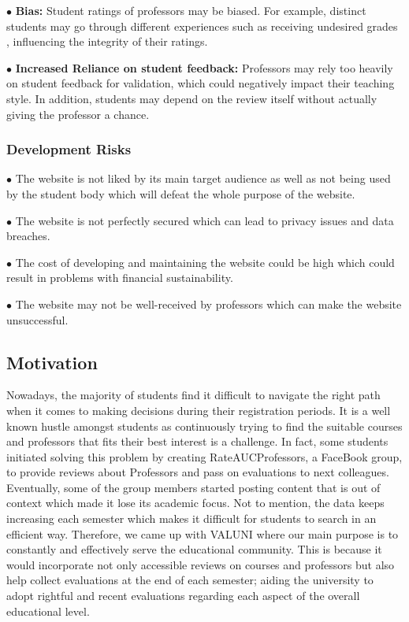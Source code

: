 \documentclass{article}
\begin{document}
$\bullet$ \textbf{Bias:} Student ratings of professors may be biased. For example, distinct students may go through different experiences such as receiving undesired grades , influencing the integrity of their ratings.

$\bullet$ \textbf{Increased Reliance on student feedback:} Professors may rely too heavily on student feedback for validation, which could negatively impact their teaching style. In addition, students may depend on the review itself without actually giving the professor a chance.

\subsubsection{Development Risks} 

$\bullet$ The website is not liked by its main target audience as well as not being used by the student body which will defeat the whole purpose of the website.

$\bullet$ The website is not perfectly secured which can lead to privacy issues and data breaches.

$\bullet$ The cost of developing and maintaining the website could be high which could result in problems with financial sustainability.

$\bullet$ The website may not be well-received by professors which can make the website unsuccessful.



\subsection{Motivation} 

\quad Nowadays, the majority of students find it difficult to navigate the right path when it comes to making decisions during their registration periods. It is a well known hustle amongst students as continuously trying  to find the suitable courses and professors that fits their best interest is a challenge.  In fact, some students initiated solving this problem by creating  RateAUCProfessors, a FaceBook group, to provide reviews about Professors and pass on evaluations to next colleagues. Eventually, some of the group members started posting content that is out of context which made it lose its academic focus. Not to mention, the data keeps increasing each semester which makes it difficult for students to search in an efficient way. Therefore, we came up with VALUNI  where our main purpose is to constantly and effectively serve the educational community. This is because it would incorporate not only accessible reviews on courses and professors but also help collect evaluations at the end of each semester; aiding the university to adopt rightful and recent evaluations regarding each aspect of the overall educational level. 
\end{document}
